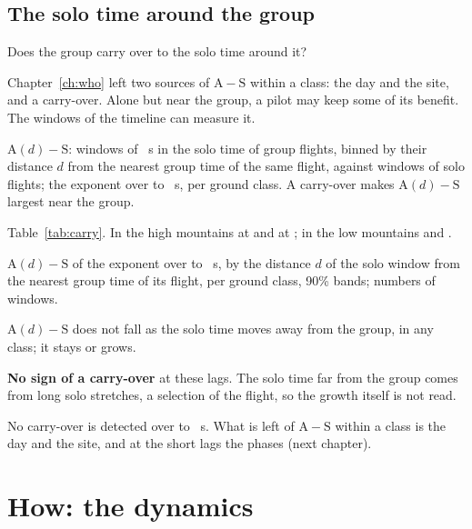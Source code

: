 \documentclass[10pt,a4paper]{article}
\newcommand{\A}{\mathrm{A}}
\newcommand{\Sl}{\mathrm{S}}
\newcommand{\Q}{\item[\textcolor{question}{\textbf{Q.}}]\color{question}}
\newcommand{\Res}{\item[\textcolor{answer}{\textbf{Result.}}]\color{black}}
\newcommand{\Home}{\item[\textcolor{answer}{\textbf{Take home.}}]\color{black}}
\newcommand{\Obs}{\item[\textcolor{answer}{\textbf{Observation.}}]\color{black}}
\newcommand{\Ded}{\item[\textcolor{answer}{\textbf{Deduction.}}]\color{black}}
\newcommand{\Why}{\item[\textcolor{black}{\textbf{Why.}}]\color{black}}
\newcommand{\Tool}{\item[\textcolor{black}{\textbf{Tool.}}]\color{black}}
\newenvironment{step}{\begin{description}[leftmargin=0pt, itemsep=7pt, topsep=8pt]}{\end{description}}
\begin{document}
\subsection{The solo time around the group}\label{carry}

\begin{step}
\Q Does the group carry over to the solo time around it?
\Why Chapter~\ref{ch:who} left two sources of $\A-\Sl$ within a class: the day and the site, and a carry-over. Alone
  but near the group, a pilot may keep some of its benefit. The windows of the timeline can measure it.
\Tool $\A(d)-\Sl$: windows of \WhenWindow~s in the solo time of group flights, binned by their distance $d$ from the
  nearest group time of the same flight, against windows of solo flights; the exponent over \WhenLongLo{} to
  \WhenLongHi~s, per ground class. A carry-over makes $\A(d)-\Sl$ largest near the group.
\Res Table~\ref{tab:carry}. In the high mountains \CarryHighMtnNear{} at \CarryNearLabel{} and \CarryHighMtnFar{} at
  \CarryFarLabel; in the low mountains \CarryLowMtnNear{} and \CarryLowMtnFar.
  \begin{table}[H]
  \centering
  \resizebox{\textwidth}{!}{}
  \caption{$\A(d)-\Sl$ of the exponent over \WhenLongLo{} to \WhenLongHi~s, by the distance $d$ of the solo window
  from the nearest group time of its flight, per ground class, 90\% bands; numbers of windows.}
  \label{tab:carry}
  \end{table}
\Obs $\A(d)-\Sl$ does not fall as the solo time moves away from the group, in any class; it stays or grows.
\Ded \textbf{No sign of a carry-over} at these lags. The solo time far from the group comes from long solo
  stretches, a selection of the flight, so the growth itself is not read.
\Home No carry-over is detected over \WhenLongLo{} to \WhenLongHi~s. What is left of $\A-\Sl$ within a class is the
  day and the site, and at the short lags the phases (next chapter).
\end{step}

\section{How: the dynamics}\label{ch:dynamics}
\end{document}
